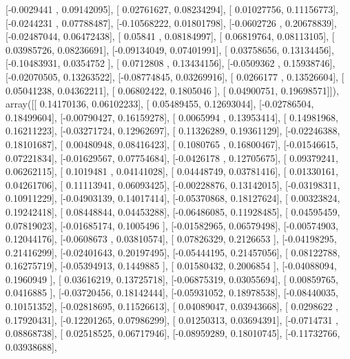 \documentclass{article}
\begin{document}
       [-0.0029441 ,  0.09142095],
       [ 0.02761627,  0.08234294],
       [ 0.01027756,  0.11156773],
       [-0.0244231 ,  0.07788487],
       [-0.10568222,  0.01801798],
       [-0.0602726 ,  0.20678839],
       [-0.02487044,  0.06472438],
       [ 0.05841   ,  0.08184997],
       [ 0.06819764,  0.08113105],
       [ 0.03985726,  0.08236691],
       [-0.09134049,  0.07401991],
       [ 0.03758656,  0.13134456],
       [-0.10483931,  0.0354752 ],
       [ 0.0712808 ,  0.13434156],
       [-0.0509362 ,  0.15938746],
       [-0.02070505,  0.13263522],
       [-0.08774845,  0.03269916],
       [ 0.0266177 ,  0.13526604],
       [ 0.05041238,  0.04362211],
       [ 0.06802422,  0.1805046 ],
       [ 0.04900751,  0.19698571]]), array([[ 0.14170136,  0.06102233],
       [ 0.05489455,  0.12693044],
       [-0.02786504,  0.18499604],
       [-0.00790427,  0.16159278],
       [ 0.0065994 ,  0.13953414],
       [ 0.14981968,  0.16211223],
       [-0.03271724,  0.12962697],
       [ 0.11326289,  0.19361129],
       [-0.02246388,  0.18101687],
       [ 0.00480948,  0.08416423],
       [ 0.1080765 ,  0.16800467],
       [-0.01546615,  0.07221834],
       [-0.01629567,  0.07754684],
       [-0.0426178 ,  0.12705675],
       [ 0.09379241,  0.06262115],
       [ 0.1019481 ,  0.04141028],
       [ 0.04448749,  0.03781416],
       [ 0.01330161,  0.04261706],
       [ 0.11113941,  0.06093425],
       [-0.00228876,  0.13142015],
       [-0.03198311,  0.10911229],
       [-0.04903139,  0.14017414],
       [-0.05370868,  0.18127624],
       [ 0.00323824,  0.19242418],
       [ 0.08448844,  0.04453288],
       [-0.06486085,  0.11928485],
       [ 0.04595459,  0.07819023],
       [-0.01685174,  0.1005496 ],
       [-0.01582965,  0.06579498],
       [-0.00574903,  0.12044176],
       [-0.0608673 ,  0.03810574],
       [ 0.07826329,  0.2126653 ],
       [-0.04198295,  0.21416299],
       [-0.02401643,  0.20197495],
       [-0.05444195,  0.21457056],
       [ 0.08122788,  0.16275719],
       [-0.05394913,  0.1449885 ],
       [ 0.01580432,  0.2006854 ],
       [-0.04088094,  0.1960949 ],
       [ 0.03616219,  0.13725718],
       [-0.06875319,  0.03055694],
       [ 0.00859765,  0.0416885 ],
       [-0.03720456,  0.18142444],
       [-0.05931052,  0.18978538],
       [-0.08440035,  0.10151352],
       [-0.02818695,  0.11526613],
       [ 0.04089047,  0.03943668],
       [ 0.0298622 ,  0.17920431],
       [-0.12201265,  0.07986299],
       [ 0.01250313,  0.03694391],
       [-0.0714731 ,  0.08868738],
       [ 0.02518525,  0.06717946],
       [-0.08959289,  0.18010745],
       [-0.11732766,  0.03938688],
\end{document}
